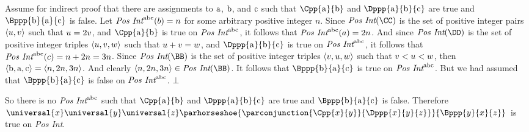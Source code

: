 \begin{PROOF}
Assume for indirect proof that there are assignments to $\mathrm{a}$, $\mathrm{b}$, and $\mathrm{c}$ such that $\Cpp{\constant{a}}{\constant{b}}$ and $\Dppp{\constant{a}}{\constant{b}}{\constant{c}}$ are true and $\Bppp{\constant{b}}{\constant{a}}{\constant{c}}$ is false.
Let $\emph{Pos Int}^{\mathrm{a}\mathrm{b}\mathrm{c}}(b)=n$ for some arbitrary positive integer $n$.
Since $\emph{Pos Int}(\CC)$ is the set of positive integer pairs $\langle u,v\rangle$ such that $u=2v$, and $\Cpp{\constant{a}}{\constant{b}}$ is true on $\emph{Pos Int}^{\mathrm{a}\mathrm{b}\mathrm{c}}$, it follows that $\emph{Pos Int}^{\mathrm{a}\mathrm{b}\mathrm{c}}(a)=2n$.
And since $\emph{Pos Int}(\DD)$ is the set of positive integer triples $\langle u,v,w\rangle$ such that $u+v=w$, and $\Dppp{\constant{a}}{\constant{b}}{\constant{c}}$ is true on $\emph{Pos Int}^{\mathrm{a}\mathrm{b}\mathrm{c}}$, it follows that $\emph{Pos Int}^{\mathrm{a}\mathrm{b}\mathrm{c}}(c)=n+2n=3n$.
Since $\emph{Pos Int}(\BB)$ is the set of positive integer triples $\langle v,u,w\rangle$ such that $v<u<w$, then $\langle \mathrm{b},\mathrm{a},\mathrm{c}\rangle=\langle n, 2n, 3n \rangle$.
And clearly $\langle n, 2n, 3n \rangle\in\emph{Pos Int}(\BB)$.
It follows that $\Bppp{\constant{b}}{\constant{a}}{\constant{c}}$ is true on $\emph{Pos Int}^{\mathrm{a}\mathrm{b}\mathrm{c}}$.
But we had assumed that $\Bppp{\constant{b}}{\constant{a}}{\constant{c}}$ is false on $\emph{Pos Int}^{\mathrm{a}\mathrm{b}\mathrm{c}}$. $\bot$

So there is no $\emph{Pos Int}^{\mathrm{a}\mathrm{b}\mathrm{c}}$ such that $\Cpp{\constant{a}}{\constant{b}}$ and $\Dppp{\constant{a}}{\constant{b}}{\constant{c}}$ are true and $\Bppp{\constant{b}}{\constant{a}}{\constant{c}}$ is false.
Therefore $\universal{\variable{x}}\universal{\variable{y}}\universal{\variable{z}}\parhorseshoe{\parconjunction{\Cpp{\variable{x}}{\variable{y}}}{\Dppp{\variable{x}}{\variable{y}}{\variable{z}}}}{\Bppp{\variable{y}}{\variable{x}}{\variable{z}}}$ is true on \emph{Pos Int}.
\end{PROOF}

